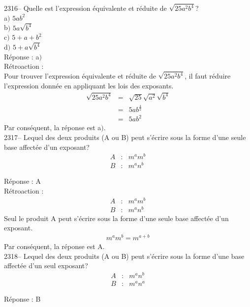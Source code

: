 \documentclass[letterpaper, 12pt]{article}
\begin{document}
2316-- Quelle est l'expression \'equivalente et r\'eduite de $ \sqrt{25a^{2}b^{4}}$?\\

a$)$  $5ab^{2}$\\
b$)$  $5a\sqrt{b^{4}}$\\
c$)$  $5+a+b^{2}$\\
d$)$  $5+a\sqrt{b^{4}}$\\

R\'eponse : a$)$\\

R\'etroaction :\\
Pour trouver l'expression \'equivalente et r\'eduite de $ \sqrt{25a^{2}b^{4}}$, il faut r\'eduire l'expression donn\'ee en appliquant les lois des exposants.
\begin{eqnarray*}
  \sqrt{25a^{2}b^{4}}&=&\sqrt{25}\sqrt{a^{2}}\sqrt{b^{4}}\\
&=&5ab^{\frac{4}{2}}\\
&=&5ab^{2}
\end{eqnarray*}
Par cons\'equent, la r\'eponse est a$)$.\\

2317-- Lequel des deux produits (A ou B) peut s'\'ecrire sous la forme d'une seule base affect\'ee d'un exposant?
\begin{eqnarray*}
 A &:& m^{a}m^{b} \\
 B &:& m^{a}n^{b}
\end{eqnarray*}

R\'eponse : A\\

R\'etroaction :
\begin{eqnarray*}
 A &:& m^{a}m^{b} \\
 B &:& m^{a}n^{b}
\end{eqnarray*}
Seul le produit A peut s'\'ecrire sous la forme d'une seule base affect\'ee d'un exposant.
\begin{eqnarray*}
 m^{a}m^{b}=m^{a+b}
\end{eqnarray*}
Par cons\'equent, la r\'eponse est A.\\

2318-- Lequel des deux produits (A ou B) peut s'\'ecrire sous la forme d'une base affect\'ee d'un seul exposant?
\begin{eqnarray*}
 A &:& m^{a}n^{b}\\
 B &:& m^{a}n^{a}
\end{eqnarray*}

R\'eponse : B\\
\end{document}
